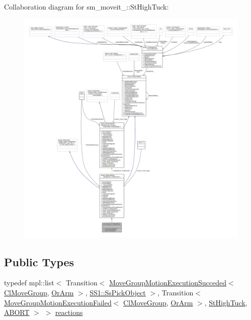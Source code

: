 Collaboration diagram for sm\+\_\+moveit\+\_\+:\+:St\+High\+Tuck\+:
\nopagebreak
\begin{figure}[H]
\begin{center}
\leavevmode
\includegraphics[width=350pt]{structsm__moveit__3_1_1StHighTuck__coll__graph}
\end{center}
\end{figure}
\subsection*{Public Types}
\begin{DoxyCompactItemize}
\item 
typedef mpl\+::list$<$ Transition$<$ \hyperlink{structmoveit__z__client_1_1MoveGroupMotionExecutionSucceded}{Move\+Group\+Motion\+Execution\+Succeded}$<$ \hyperlink{classmoveit__z__client_1_1ClMoveGroup}{Cl\+Move\+Group}, \hyperlink{classsm__moveit__3_1_1OrArm}{Or\+Arm} $>$, \hyperlink{structsm__moveit__3_1_1SS1_1_1SsPickObject}{S\+S1\+::\+Ss\+Pick\+Object} $>$, Transition$<$ \hyperlink{structmoveit__z__client_1_1MoveGroupMotionExecutionFailed}{Move\+Group\+Motion\+Execution\+Failed}$<$ \hyperlink{classmoveit__z__client_1_1ClMoveGroup}{Cl\+Move\+Group}, \hyperlink{classsm__moveit__3_1_1OrArm}{Or\+Arm} $>$, \hyperlink{structsm__moveit__3_1_1StHighTuck}{St\+High\+Tuck}, \hyperlink{classABORT}{A\+B\+O\+RT} $>$ $>$ \hyperlink{structsm__moveit__3_1_1StHighTuck_a14e727ee48019a59fb9f27737fb57a7e}{reactions}
\end{DoxyCompactItemize}
